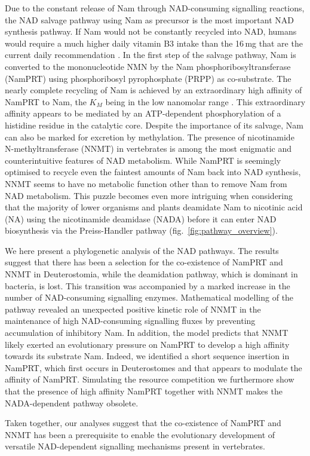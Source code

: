 Due to the constant release of Nam through NAD-consuming signalling reactions, the NAD salvage pathway using Nam as precursor is the most important NAD synthesis pathway. If Nam would not be constantly recycled into NAD, humans would require a much higher daily vitamin B3 intake than the 16\,mg that are the current daily recommendation \cite{CommissionofEuropeanCommunities2008}. In the first step of the salvage pathway, Nam is converted to the mononucleotide NMN by the Nam phosphoribosyltransferase (NamPRT) using phosphoribosyl pyrophosphate (PRPP) as co-substrate. The nearly complete recycling of Nam is achieved by an extraordinary high affinity of NamPRT to Nam, the $K_{M}$ being in the low nanomolar range \cite{Burgos2008}. This extraordinary affinity appears to be mediated by an ATP-dependent phosphorylation of a histidine residue in the catalytic core. Despite the importance of its salvage, Nam can also be marked for excretion by methylation. The presence of nicotinamide N-methyltransferase (NNMT) in vertebrates \cite{Gossmann2012FEBS} is among the most enigmatic and counterintuitive features of NAD metabolism. While NamPRT is seemingly optimised to recycle even the faintest amounts of Nam back into NAD synthesis, NNMT seems to have no metabolic function other than to remove Nam from NAD metabolism. This puzzle becomes even more intriguing when considering that the majority of lower organisms and plants deamidate Nam to nicotinic acid (NA) using the nicotinamide deamidase (NADA) before it can enter NAD biosynthesis via the Preiss-Handler pathway (fig.~\ref{fig:pathway_overview}).

We here present a phylogenetic analysis of the NAD pathways. The results suggest that there has been a selection for the co-existence of NamPRT and NNMT in Deuterostomia, while the deamidation pathway, which is dominant in bacteria, is lost. This transition was accompanied by a marked increase in the number of NAD-consuming signalling enzymes. Mathematical modelling of the pathway revealed an unexpected positive kinetic role of NNMT in the maintenance of high NAD-consuming signalling fluxes by preventing accumulation of inhibitory Nam. In addition, the model predicts that NNMT likely exerted an evolutionary pressure on NamPRT to develop a high affinity towards its substrate Nam. Indeed, we identified a short sequence insertion in NamPRT, which first occurs in Deuterostomes and that appears to modulate the affinity of NamPRT. Simulating the resource competition we furthermore show that the presence of high affinity NamPRT together with NNMT makes the NADA-dependent pathway obsolete.

Taken together, our analyses suggest that the co-existence of NamPRT and NNMT has been a prerequisite to enable the evolutionary development of versatile NAD-dependent signalling mechanisms present in vertebrates.
